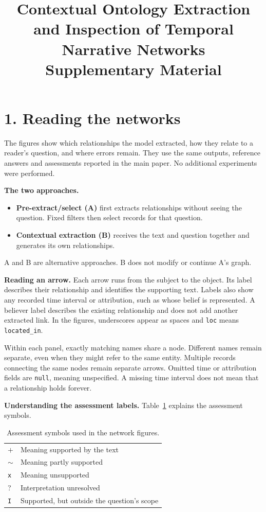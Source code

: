 \documentclass[a4paper,10pt]{article}
\title{Contextual Ontology Extraction and Inspection of Temporal Narrative Networks\\[0.5em]
{\large Supplementary Material}}
\author{}
\date{}
\begin{document}
\RaggedRight
\maketitle





\section*{1. Reading the networks}
The figures show which relationships the model extracted, how they relate to a reader's question, and where errors remain. They use the same outputs, reference answers and assessments reported in the main paper. No additional experiments were performed.

\textbf{The two approaches.}
\begin{itemize}
\item \textbf{Pre-extract/select (A)} first extracts relationships without seeing the question. Fixed filters then select records for that question.
\item \textbf{Contextual extraction (B)} receives the text and question together and generates its own relationships.
\end{itemize}
A and B are alternative approaches. B does not modify or continue A's graph.

\textbf{Reading an arrow.}
Each arrow runs from the subject to the object. Its label describes their relationship and identifies the supporting text. Labels also show any recorded time interval or attribution, such as whose belief is represented. A believer label describes the existing relationship and does not add another extracted link. In the figures, underscores appear as spaces and \texttt{loc} means \texttt{located\_in}.

Within each panel, exactly matching names share a node. Different names remain separate, even when they might refer to the same entity. Multiple records connecting the same nodes remain separate arrows. Omitted time or attribution fields are \texttt{null}, meaning unspecified. A missing time interval does not mean that a relationship holds forever.

\textbf{Understanding the assessment labels.}
Table~\ref{tab:supp-assessment-legend} explains the assessment symbols.

\begin{table}[htbp]
\centering
\caption{Assessment symbols used in the network figures.}
\label{tab:supp-assessment-legend}
\begin{tabular}{@{}ll@{}}
$+$         & Meaning supported by the text \\
$\sim$      & Meaning partly supported \\
\texttt{x}  & Meaning unsupported \\
?           & Interpretation unresolved \\
\texttt{I}  & Supported, but outside the question's scope \\
\end{tabular}
\end{table}
\end{document}
